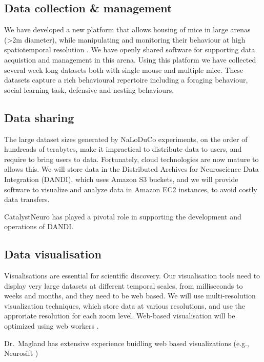\subsection{Data collection \& management}

We have developed a new platform that allows housing of mice in large arenas
(\textgreater 2m diameter), while manipulating and monitoring their behaviour
at high spatiotemporal resolution \citep[Figure~\ref{fig:arena}, ][]{campagnerEtAl24}.
%
We have openly shared software for supporting data acquistion
\citep{aeonacquisition} and management \citep{aeonmecha} in this
arena.
%
Using this platform we have collected several week long datasets both with
single mouse and multiple mice.
%
These datasets capture a rich behavioural repertoire including a foraging
behaviour,  social learning task, defensive and nesting behaviours.



\subsection{Data sharing}

The large dataset sizes generated by NaLoDuCo experiments, on the order of
hundreads of terabytes,  make it impractical to distribute data to users, and
require to bring users to data. Fortunately, cloud technologies are now mature
to allows this.
%
We will store data in the Distributed Archives for Neuroscience Data
Integration (DANDI), which uses Amazon S3 buckets, and we will provide software
to visualize and analyze data in Amazon EC2 instances, to avoid costly data
transfers.

CatalystNeuro has played a pivotal role in supporting the development and
operations of DANDI.

\subsection{Data visualisation}

Visualisations are essential for scientific discovery. Our visualisation tools
need to display very large datasets at different temporal scales, from
milliseconds to weeks and months, and they need to be web based.
%
We will use multi-resolution visualization techniques, which store data at
various resolutions, and use the approriate resolution for each zoom level.
%
Web-based visualisation will be optimized using web workers
\cite{webWorkers}.

Dr.~Magland has extensive experience buidling web based visualizations (e.g.,
Neurosift \cite{neurosift})

